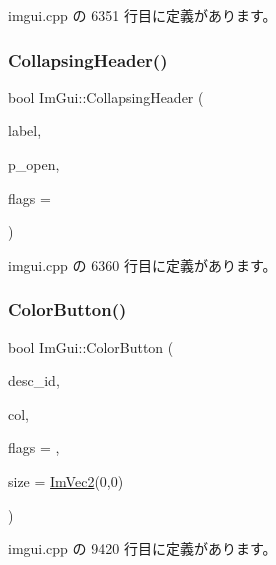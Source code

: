  imgui.\+cpp の 6351 行目に定義があります。

\mbox{\label{namespace_im_gui_a19f369fc61f49ab7995ebb4da99028db}} 
\subsubsection{\texorpdfstring{Collapsing\+Header()}{CollapsingHeader()}\hspace{0.1cm}{\footnotesize\ttfamily [2/2]}}
{\footnotesize\ttfamily bool Im\+Gui\+::\+Collapsing\+Header (\begin{DoxyParamCaption}\item[{const char $\ast$}]{label,  }\item[{bool $\ast$}]{p\+\_\+open,  }\item[{\mbox{\hyperlink{imgui_8h_a0588fdd10c59b49a0159484fe9ec4564}{Im\+Gui\+Tree\+Node\+Flags}}}]{flags = {} }\end{DoxyParamCaption})}



 imgui.\+cpp の 6360 行目に定義があります。

\mbox{\label{namespace_im_gui_a82b18bfe08594b76c08894848d1e6fce}} 
\subsubsection{\texorpdfstring{Color\+Button()}{ColorButton()}}
{\footnotesize\ttfamily bool Im\+Gui\+::\+Color\+Button (\begin{DoxyParamCaption}\item[{const char $\ast$}]{desc\+\_\+id,  }\item[{const \mbox{\hyperlink{struct_im_vec4}{Im\+Vec4}} \&}]{col,  }\item[{\mbox{\hyperlink{imgui_8h_a6b2d5e95adc38f22c021252189f669c6}{Im\+Gui\+Color\+Edit\+Flags}}}]{flags = {},  }\item[{\mbox{\hyperlink{struct_im_vec2}{Im\+Vec2}}}]{size = {\ttfamily \mbox{\hyperlink{struct_im_vec2}{Im\+Vec2}}(0,0)} }\end{DoxyParamCaption})}



 imgui.\+cpp の 9420 行目に定義があります。

